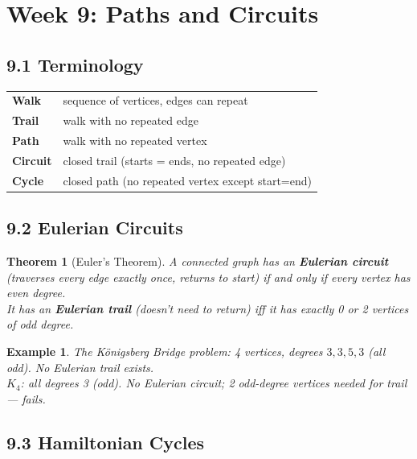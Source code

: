 \documentclass[11pt]{article}
\newtheorem{example}[definition]{Example}
\newtheorem{theorem}[definition]{Theorem}
\begin{document}
\section{Week 9: Paths and Circuits}
\setcounter{definition}{0}

\subsection*{9.1 Terminology}

\begin{tcolorbox}[keybox={Walk / Trail / Path / Circuit}]
\begin{tabular}{@{}ll@{}}
\textbf{Walk}     & sequence of vertices, edges can repeat\\
\textbf{Trail}    & walk with no repeated edge\\
\textbf{Path}     & walk with no repeated vertex\\
\textbf{Circuit}  & closed trail (starts = ends, no repeated edge)\\
\textbf{Cycle}    & closed path (no repeated vertex except start=end)\\
\end{tabular}
\end{tcolorbox}

\subsection*{9.2 Eulerian Circuits}

\begin{theorem}[Euler's Theorem]
A connected graph has an \textbf{Eulerian circuit} (traverses every edge exactly once, returns to start) if and only if every vertex has even degree.\\
It has an \textbf{Eulerian trail} (doesn't need to return) iff it has exactly 0 or 2 vertices of odd degree.
\end{theorem}

\begin{example}
The Königsberg Bridge problem: 4 vertices, degrees $3,3,5,3$ (all odd). No Eulerian trail exists.\\
$K_4$: all degrees 3 (odd). No Eulerian circuit; 2 odd-degree vertices needed for trail — fails.
\end{example}

\subsection*{9.3 Hamiltonian Cycles}
\end{document}
